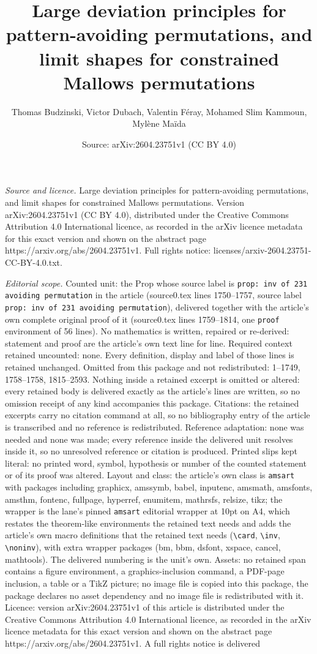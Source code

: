 \documentclass[10pt,a4paper]{amsart}
\title[Large deviation principles for pattern-avoiding permutations]{Large deviation principles for pattern-avoiding permutations, and limit shapes for constrained Mallows permutations}
\author{Thomas Budzinski, Victor Dubach, Valentin F\'eray, Mohamed Slim Kammoun, Myl\`ene Ma\"ida}
\date{Source: arXiv:2604.23751v1 (CC BY 4.0)}
\begin{document}
\maketitle

\noindent\emph{Source and licence.} Large deviation principles for pattern-avoiding permutations, and limit shapes for constrained Mallows permutations. Version arXiv:2604.23751v1 (CC BY 4.0), distributed under the Creative Commons Attribution 4.0 International licence, as recorded in the arXiv licence metadata for this exact version and shown on the abstract page https://arxiv.org/abs/2604.23751v1. Full rights notice: licenses/arxiv-2604.23751-CC-BY-4.0.txt.\par\smallskip

\noindent\textit{Editorial scope.} Counted unit: the Prop whose source label is \texttt{prop: inv of 231 avoiding permutation} in the article (source0.tex lines 1750--1757, source label \texttt{prop: inv of 231 avoiding permutation}), delivered together with the article's own complete original proof of it (source0.tex lines 1759--1814, one \texttt{proof} environment of 56 lines). No mathematics is written, repaired or re-derived: statement and proof are the article's own text line for line. Required context retained uncounted: none. Every definition, display and label of those lines is retained unchanged. Omitted from this package and not redistributed: 1--1749, 1758--1758, 1815--2593. Nothing inside a retained excerpt is omitted or altered: every retained body is delivered exactly as the article's lines are written, so no omission receipt of any kind accompanies this package. Citations: the retained excerpts carry no citation command at all, so no bibliography entry of the article is transcribed and no reference is redistributed. Reference adaptation: none was needed and none was made; every reference inside the delivered unit resolves inside it, so no unresolved reference or citation is produced. Printed slips kept literal: no printed word, symbol, hypothesis or number of the counted statement or of its proof was altered. Layout and class: the article's own class is \texttt{amsart} with packages including graphicx, amssymb, babel, inputenc, amsmath, amsfonts, amsthm, fontenc, fullpage, hyperref, enumitem, mathrsfs, relsize, tikz; the wrapper is the lane's pinned \texttt{amsart} editorial wrapper at 10pt on A4, which restates the theorem-like environments the retained text needs and adds the article's own macro definitions that the retained text needs (\texttt{\textbackslash card}, \texttt{\textbackslash inv}, \texttt{\textbackslash noninv}), with extra wrapper packages (bm, bbm, dsfont, xspace, cancel, mathtools). The delivered numbering is the unit's own. Assets: no retained span contains a figure environment, a graphics-inclusion command, a PDF-page inclusion, a table or a TikZ picture; no image file is copied into this package, the package declares no asset dependency and no image file is redistributed with it. Licence: version arXiv:2604.23751v1 of this article is distributed under the Creative Commons Attribution 4.0 International licence, as recorded in the arXiv licence metadata for this exact version and shown on the abstract page https://arxiv.org/abs/2604.23751v1. A full rights notice is delivered 
\end{document}
